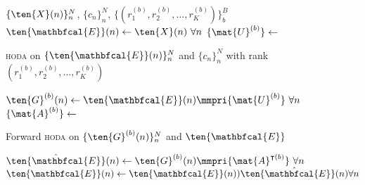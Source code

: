 \begin{algorithmic}[1]
  \Require $\{\ten{X}(n)\}_n^N$, $\{c_n\}_n^N$,
  $\{(r_1^{(b)},r_2^{(b)},\ldots,r_K^{(b)})\}_b^B$
  \State $\ten{\mathbfcal{E}}(n)\gets\ten{X}(n)\ \forall n$
  \State $\{\mat{U}^{(b)}\}\gets$ \parbox[t]{5cm}{\textsc{hoda} on $\{\ten{\mathbfcal{E}}(n)\}_n^N$ and
  $\{c_n\}_n^N$ with rank $(r_1^{(b)},r_2^{(b)},\ldots,r_K^{(b)})$}
  \State $\ten{G}^{(b)}(n)\gets\ten{\mathbfcal{E}}(n)\mmpri{\mat{U}^{(b)}}\
  \forall n$
  \State $\{\mat{A}^{(b)}\}\gets$ \parbox[t]{5cm}{Forward \textsc{hoda} on
  $\{\ten{G}^{(b)}(n)\}_n^N$ and $\ten{\mathbfcal{E}}$}
  \State
  $\hat{\ten{\mathbfcal{E}}}(n)\gets\ten{G}^{(b)}(n)\mmpri{\mat{A}^{\intercal(b)}}\
  \forall n$
  \State
  $\ten{\mathbfcal{E}}(n)\gets \ten{\mathbfcal{E}}(n) )
  \hat{\ten{\mathbfcal{E}}(n)} \forall n$

  \EndFor
\end{algorithmic}
